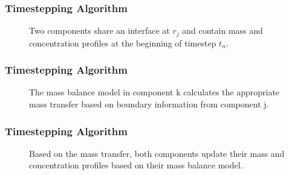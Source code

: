 %
%      

\begin{frame}
\frametitle{Timestepping Algorithm}

\begin{figure}[htbp!]
  \begin{center}
    \def\svgwidth{.5\textwidth}
    
  \end{center}
  \caption{Two components share an interface at $r_j$ and contain mass and 
  concentration profiles at the beginning of timestep $t_n$.}
  \label{fig:vols}
\end{figure}

\end{frame}
\begin{frame}
\frametitle{Timestepping Algorithm}

\begin{figure}[htbp!]
  \begin{center}
    \def\svgwidth{.5\textwidth}
    
  \end{center}
  \caption{The mass balance model in component k calculates the appropriate 
  mass transfer based on boundary information from component j.}
  \label{fig:vols_trans}
\end{figure}

\end{frame}
\begin{frame}
\frametitle{Timestepping Algorithm}

\begin{figure}[htbp!]
  \begin{center}
    \def\svgwidth{.5\textwidth}
    
  \end{center}
  \caption{Based on the mass transfer, both components update their mass and 
  concentration profiles based on their mass balance model.}
  \label{fig:vols_update}
\end{figure}

\end{frame}


